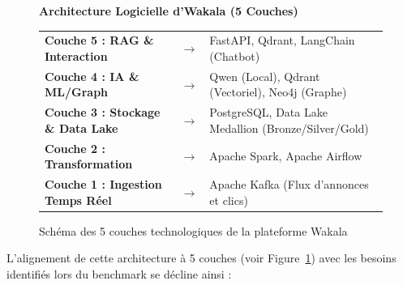 \documentclass[11pt,a4paper]{article}
\begin{document}
\begin{figure}[htbp]
  \centering
  \begin{tcolorbox}[colback=white, colframe=black!30!white, arc=1mm, width=\textwidth, before={\par\noindent\vspace{10pt}}, after=\vspace{10pt}]
    \centering
    \textbf{Architecture Logicielle d'Wakala (5 Couches)}\\[0.3cm]
    \begin{tabular}{llp{6.8cm}}
      \textbf{Couche 5 : RAG \& Interaction} & $\rightarrow$ & FastAPI, Qdrant, LangChain (Chatbot) \\
      \textbf{Couche 4 : IA \& ML/Graph} & $\rightarrow$ & Qwen (Local), Qdrant (Vectoriel), Neo4j (Graphe) \\
      \textbf{Couche 3 : Stockage \& Data Lake} & $\rightarrow$ & PostgreSQL, Data Lake Medallion (Bronze/Silver/Gold) \\
      \textbf{Couche 2 : Transformation} & $\rightarrow$ & Apache Spark, Apache Airflow \\
      \textbf{Couche 1 : Ingestion Temps Réel} & $\rightarrow$ & Apache Kafka (Flux d'annonces et clics) \\
    \end{tabular}
  \end{tcolorbox}
  \caption{Schéma des 5 couches technologiques de la plateforme Wakala}
  \label{fig:layers}
\end{figure}

L'alignement de cette architecture à 5 couches (voir Figure~\ref{fig:layers}) avec les besoins identifiés lors du benchmark se décline ainsi :
\end{document}
